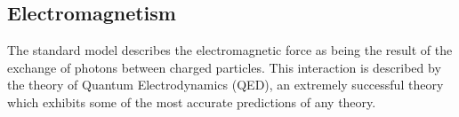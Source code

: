 \subsection{Electromagnetism}

The standard model describes the electromagnetic force as being the result of the exchange of photons between charged particles. This interaction is described by the theory of Quantum Electrodynamics (QED), an extremely successful theory which exhibits some of the most accurate predictions of any theory. 